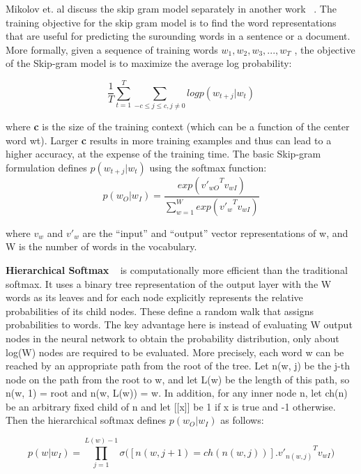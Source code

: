 Mikolov et. al  discuss the skip gram model separately in another work ~\parencite{mikolov2}. The training objective for the skip gram model is to find the word representations that are useful for predicting the surounding words in a sentence or a document. More formally, given a sequence of training words ${w}_{1}, {w}_{2}, {w}_{3}, . . . , {w}_{T}$ , the objective of the Skip-gram model is to maximize the average log probability:

\begin{equation}
\frac{1}{T} \sum_{t=1}^{T} \sum_{-c \leq j  \leq c, j \neq 0} log p({w}_{t+j} | {w}_{t})
\end{equation}


where \textbf{c} is the size of the training context (which can be a function of the center word wt). Larger \textbf{c} results in more training examples and thus can lead to a higher accuracy, at the expense of the training time. The basic Skip-gram formulation defines $p({w}_{t+j} | {w}_{t})$ using the softmax function:
\begin{equation}
p({w}_{O}|{w}_{I}) = \frac{exp({{v'}_{wO}}^{T} {v}_{wI} )}{ \sum_{w=1}^{W} exp({{v'}_{w}}^{T} {v}_{wI} ) }
\end{equation}

where ${v}_{w}$ and ${v'}_{w}$ are the “input” and “output” vector representations of w, and W is the number of words in the vocabulary. 
\newline

\textbf{Hierarchical Softmax} ~\parencite{morbengio} is computationally more efficient than the traditional softmax. It uses a binary tree representation of the output layer with the W words as its leaves and for each node explicitly represents the relative probabilities of its child nodes. These define a random walk that assigns probabilities to words. The key advantage here is instead of evaluating W output nodes in the neural network to obtain the probability distribution, only about log(W) nodes are required to be evaluated. More precisely, each word w can be reached by an appropriate path from the root of the tree. Let n(w, j) be the j-th node on the path from the root to w, and let L(w) be the length of this path, so n(w, 1) = root and n(w, L(w)) = w. In addition, for any inner node n, let ch(n) be an arbitrary fixed child of n and let [[x]] be 1 if x is true and -1 otherwise. Then the hierarchical softmax defines $p({w}_{O}|{w}_{I})$ as follows:

\begin{equation}
p({w}|{w}_{I}) =  \prod_{j=1}^{L(w)-1}  \sigma  \big( [ n (w, j + 1) = ch (n(w,j))]. {{v'}_{n(w,j)}}^{T} {v}_{wI} \big)
\end{equation}

